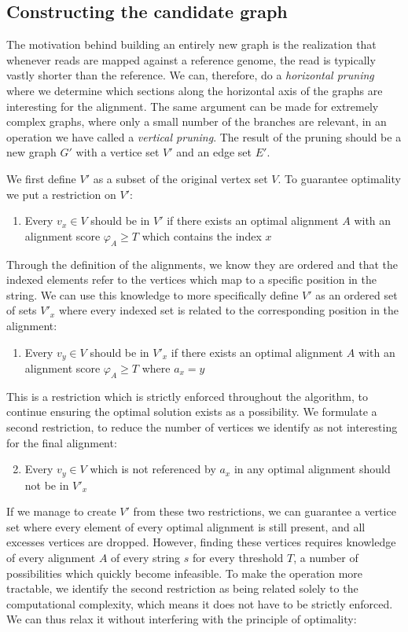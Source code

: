\documentclass[thesis.tex]{subfiles}
\begin{document}
\subsection{Constructing the candidate graph}
The motivation behind building an entirely new graph is the realization that whenever reads are mapped against a reference genome, the read is typically vastly shorter than the reference. We can, therefore, do a \textit{horizontal pruning} where we determine which sections along the horizontal axis of the graphs are interesting for the alignment. The same argument can be made for extremely complex graphs, where only a small number of the branches are relevant, in an operation we have called a \textit{vertical pruning}. The result of the pruning should be a new graph $G'$ with a vertice set $V'$ and an edge set $E'$.\\
\par\noindent
We first define $V'$ as a subset of the original vertex set $V$. To guarantee optimality we put a restriction on $V'$:
\begin{enumerate}
  \item Every $v_x \in V$ should be in $V'$ if there exists an optimal alignment $A$ with an alignment score $\varphi_A \geq T$ which contains the index $x$
\end{enumerate}
Through the definition of the alignments, we know they are ordered and that the indexed elements refer to the vertices which map to a specific position in the string. We can use this knowledge to more specifically define $V'$ as an ordered set of sets $V'_x$ where every indexed set is related to the corresponding position in the alignment:
\begin{enumerate}
  \item Every $v_y \in V$ should be in $V'_x$ if there exists an optimal alignment $A$ with an alignment score  $\varphi_A \geq T$ where $a_x=y$
\end{enumerate}
This is a restriction which is strictly enforced throughout the algorithm, to continue ensuring the optimal solution exists as a possibility. We formulate a second restriction, to reduce the number of vertices we identify as not interesting for the final alignment:
\begin{enumerate}
  \setcounter{enumi}{1}
  \item Every $v_y \in V$ which is not referenced by $a_x$ in any optimal alignment should not be in $V'_x$
\end{enumerate}
If we manage to create $V'$ from these two restrictions, we can guarantee a vertice set where every element of every optimal alignment is still present, and all excesses vertices are dropped. However, finding these vertices requires knowledge of every alignment $A$ of every string $s$ for every threshold $T$, a number of possibilities which quickly become infeasible. To make the operation more tractable, we identify the second restriction as being related solely to the computational complexity, which means it does not have to be strictly enforced. We can thus relax it without interfering with the principle of optimality:
\end{document}
